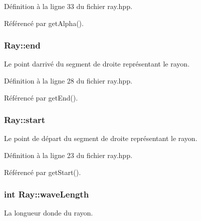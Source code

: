 Définition à la ligne 33 du fichier ray.\+hpp.



Référencé par get\+Alpha().

\hypertarget{classRay_aceb35dc199d12219c6990ca03627dc43}{}
\subsubsection[{end}]{ Ray\+::end\hspace{0.3cm}{\ttfamily [protected]}}\label{classRay_aceb35dc199d12219c6990ca03627dc43}


Le point d\textquotesingle{}arrivé du segment de droite représentant le rayon. 



Définition à la ligne 28 du fichier ray.\+hpp.



Référencé par get\+End().

\hypertarget{classRay_a15f35dc363823ce843f4d87e9e0083b9}{}
\subsubsection[{start}]{ Ray\+::start\hspace{0.3cm}{\ttfamily [protected]}}\label{classRay_a15f35dc363823ce843f4d87e9e0083b9}


Le point de départ du segment de droite représentant le rayon. 



Définition à la ligne 23 du fichier ray.\+hpp.



Référencé par get\+Start().

\hypertarget{classRay_aaa9ec19c151d6ad78d0d0b643b4940df}{}
\subsubsection[{wave\+Length}]{\setlength{\rightskip}{0pt plus 5cm}int Ray\+::wave\+Length\hspace{0.3cm}{\ttfamily [protected]}}\label{classRay_aaa9ec19c151d6ad78d0d0b643b4940df}


La longueur d\textquotesingle{}onde du rayon. 



